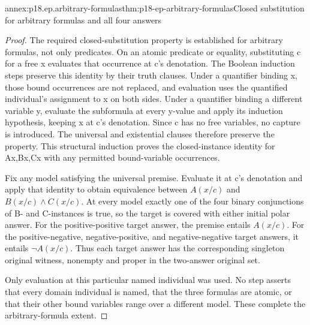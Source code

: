\begin{annexitem}{annex:p18.ep.arbitrary-formulas}{thm:p18-ep-arbitrary-formulas}{Closed substitution for arbitrary formulas and all four answers}
\begin{proof}
The required closed-substitution property is established for arbitrary
formulas, not only predicates. On an atomic predicate or equality,
substituting c for a free x evaluates that occurrence at c's denotation.
The Boolean induction steps preserve this identity by their truth clauses.
Under a quantifier binding x, those bound occurrences are not replaced,
and evaluation uses the quantified individual's assignment to x on both
sides. Under a quantifier binding a different variable y, evaluate the
subformula at every y-value and apply its induction hypothesis, keeping
x at c's denotation. Since c has no free variables, no capture is
introduced. The universal and existential clauses therefore preserve
the property. This structural induction proves the closed-instance
identity for Ax,Bx,Cx with any permitted bound-variable occurrences.

Fix any model satisfying the universal premise. Evaluate it at c's
denotation and apply that identity to obtain equivalence between
\(A(x/c)\) and \(B(x/c)\land C(x/c)\). At every model exactly
one of the four binary conjunctions of B- and C-instances is true,
so the target is covered with either initial polar answer. For the
positive-positive target answer, the premise entails \(A(x/c)\).
For the positive-negative, negative-positive, and negative-negative
target answers, it entails \(\neg A(x/c)\). Thus each target
answer has the corresponding singleton original witness, nonempty
and proper in the two-answer original set.

Only evaluation at this particular named individual was used.
No step asserts that every domain individual is named, that the
three formulas are atomic, or that their other bound variables range
over a different model. These complete the arbitrary-formula extent.
\end{proof}
\end{annexitem}

